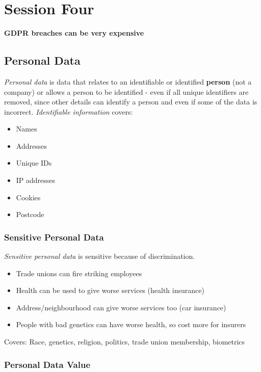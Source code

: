 \section{Session Four}\label{sec:fpse_session_four}

\textbf{GDPR breaches can be very expensive}

\subsection{Personal Data}\label{sub:personal_data}

\emph{Personal data} is data that relates to an identifiable or identified \textbf{person} (not a company) or allows a person to be identified - even if all unique identifiers are removed, since other details can identify a person and even if some of the data is incorrect.
\emph{Identifiable information} covers:

\begin{itemize}
	\item Names
	\item Addresses
	\item Unique IDs
	\item IP addresses
	\item Cookies
	\item Postcode
\end{itemize}

\subsubsection{Sensitive Personal Data}\label{ssub:sensitive_personal_data}

\emph{Sensitive personal data} is sensitive because of discrimination.

\begin{itemize}
	\item Trade unions can fire striking employees
	\item Health can be used to give worse services (health insurance)
	\item Address/neighbourhood can give worse services too (car insurance)
	\item People with bad genetics can have worse health, so cost more for insurers
\end{itemize}

\noindent
Covers: Race, genetics, religion, politics, trade union membership, biometrics

\subsubsection{Personal Data Value}\label{ssub:personal_data_value}

